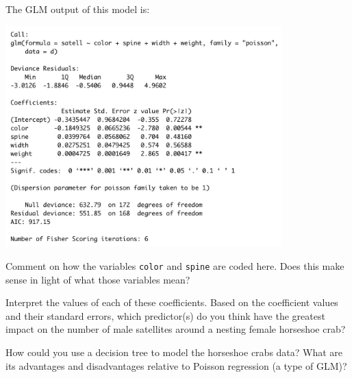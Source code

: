 \noindent The GLM output of this model is:

\begin{center}
\includegraphics[width=0.8\textwidth]{img/poisson-horseshoe-model.png}
\end{center}

\begin{question}{}
Comment on how the variables \texttt{color} and \texttt{spine} are coded here. Does this make sense in light of what those variables mean?
\end{question}

\begin{question}{}
Interpret the values of each of these coefficients. Based on the coefficient values and their standard errors, which predictor(s) do you think have the greatest impact on the number of male satellites around a nesting female horseshoe crab? 
\end{question}

\begin{question}{}
How could you use a decision tree to model the horseshoe crabs data? What are its advantages and disadvantages relative to Poisson regression (a type of GLM)?
\end{question}

